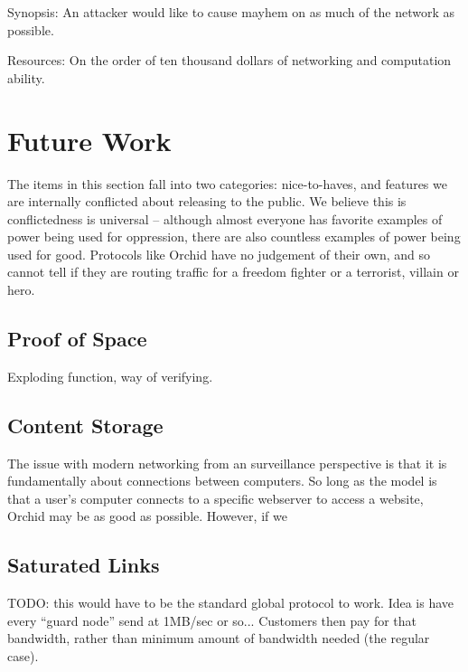\documentclass{article}
\newcommand{\mesh}{Orchid}
\newcommand{\Mesh}{\mesh}
\begin{document}
Synopsis: An attacker would like to cause mayhem on as much of the network as possible.

Resources: On the order of ten thousand dollars of networking and computation ability.



\section{Future Work}
\label{sec:future}

The items in this section fall into two categories: nice-to-haves, and features we are internally conflicted about releasing to the public. We believe this is conflictedness is universal -- although almost everyone has favorite examples of power being used for oppression, there are also countless examples of power being used for good. Protocols like \Mesh{} have no judgement of their own, and so cannot tell if they are routing traffic for a freedom fighter or a terrorist, villain or hero.

\subsection{Proof of Space}
\label{future:proof-of-space}

Exploding function, way of verifying.

\subsection{Content Storage}
\label{subsec:ccn}

The issue with modern networking from an surveillance perspective is that it is fundamentally about connections between computers. So long as the model is that a user's computer connects to a specific webserver to access a website, \Mesh{} may be as good as possible. However, if we

\subsection{Saturated Links}
\label{subsec:saturated-links}

TODO: this would have to be the standard global protocol to work. Idea is have every ``guard node'' send at 1MB/sec or so... Customers then pay for that bandwidth, rather than minimum amount of bandwidth needed (the regular case).
\end{document}
